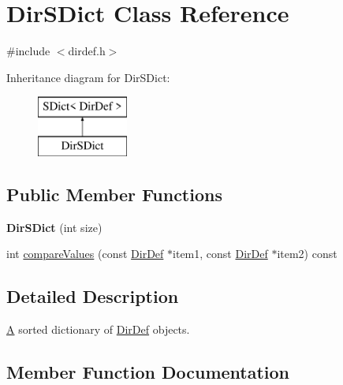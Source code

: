 \hypertarget{class_dir_s_dict}{}\section{Dir\+S\+Dict Class Reference}
\label{class_dir_s_dict}


{\ttfamily \#include $<$dirdef.\+h$>$}

Inheritance diagram for Dir\+S\+Dict\+:\begin{figure}[H]
\begin{center}
\leavevmode
\includegraphics[height=2.000000cm]{class_dir_s_dict}
\end{center}
\end{figure}
\subsection*{Public Member Functions}
\begin{DoxyCompactItemize}
\item 
\mbox{\label{class_dir_s_dict_a1feef589519af79e8a578b8bce4d7718}} 
{\bfseries Dir\+S\+Dict} (int size)
\item 
int \mbox{\hyperlink{class_dir_s_dict_a50f500432c67317dec26cac267791005}{compare\+Values}} (const \mbox{\hyperlink{class_dir_def}{Dir\+Def}} $\ast$item1, const \mbox{\hyperlink{class_dir_def}{Dir\+Def}} $\ast$item2) const
\end{DoxyCompactItemize}


\subsection{Detailed Description}
\mbox{\hyperlink{class_a}{A}} sorted dictionary of \mbox{\hyperlink{class_dir_def}{Dir\+Def}} objects. 

\subsection{Member Function Documentation}
\mbox{\label{class_dir_s_dict_a50f500432c67317dec26cac267791005}} 
